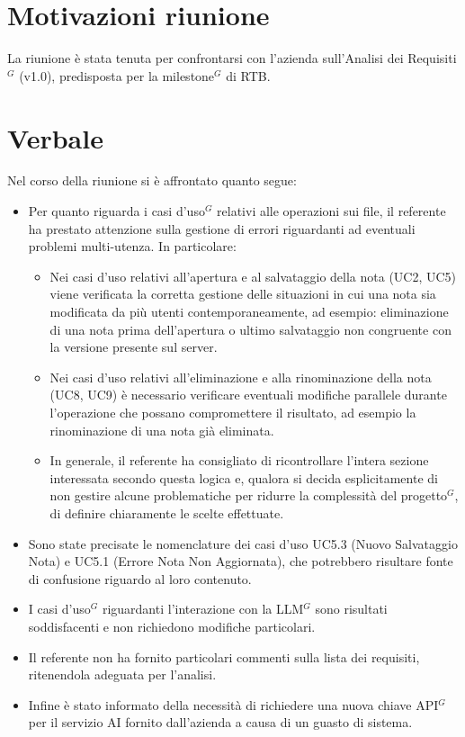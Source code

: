 \documentclass[a4paper,10pt]{article}
\begin{document}
\section*{Motivazioni riunione}
La riunione è stata tenuta per confrontarsi con l’azienda sull’Analisi dei Requisiti$^G$ (v1.0), predisposta per la milestone$^G$ di RTB.

\newpage

\section*{Verbale}
Nel corso della riunione si è affrontato quanto segue: \\
\begin{itemize}
  \item Per quanto riguarda i casi d'uso$^G$ relativi alle operazioni sui file, il referente ha prestato attenzione sulla gestione di errori riguardanti ad eventuali problemi multi-utenza. In particolare:
  \begin{itemize}\setlength{\itemsep}{6pt}
    \item Nei casi d’uso relativi all’apertura e al salvataggio della nota (UC2, UC5) viene verificata la corretta gestione delle situazioni in cui una nota sia modificata da più utenti contemporaneamente, ad esempio: eliminazione di una nota prima dell’apertura o ultimo salvataggio non congruente con la versione presente sul server.
    \item Nei casi d’uso relativi all’eliminazione e alla rinominazione della nota (UC8, UC9) è necessario verificare eventuali modifiche parallele durante l’operazione che possano compromettere il risultato, ad esempio la rinominazione di una nota già eliminata.
    \item In generale, il referente ha consigliato di ricontrollare l’intera sezione interessata secondo questa logica e, qualora si decida esplicitamente di non gestire alcune problematiche per ridurre la complessità del progetto$^G$, di definire chiaramente le scelte effettuate.
  \end{itemize}
  \item Sono state precisate le nomenclature dei casi d’uso UC5.3 (Nuovo Salvataggio Nota) e UC5.1 (Errore Nota Non Aggiornata), che potrebbero risultare fonte di confusione riguardo al loro contenuto.
  \item I casi d'uso$^G$ riguardanti l'interazione con la LLM$^G$ sono risultati soddisfacenti e non richiedono modifiche particolari.
  \item Il referente non ha fornito particolari commenti sulla lista dei requisiti, ritenendola adeguata per l’analisi.
  \item Infine è stato informato della necessità di richiedere una nuova chiave API$^G$ per il servizio AI fornito dall’azienda a causa di un guasto di sistema.
\end{itemize}
\end{document}

